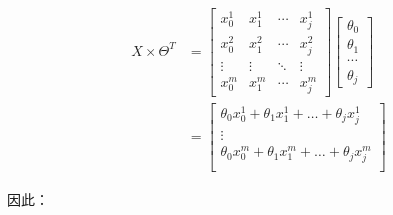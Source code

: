 \documentclass[12pt, a4paper]{article}
\begin{document}
\begin{enumerate}
          \begin{align*}
              X \times \Theta^T & = 
              \left[
                  \begin{matrix}
                      x_0^1  & x_1^1  & \cdots & x_j^1  \\
                      x_0^2  & x_1^2  & \cdots & x_j^2  \\
                      \vdots & \vdots & \ddots & \vdots \\
                      x_0^m  & x_1^m  & \cdots & x_j^m
                  \end{matrix}
                  \right]
              \left[
                  \begin{matrix}
                      \theta_0 \\
                      \theta_1 \\
                      \cdots   \\
                      \theta_j  
                  \end{matrix}
                  \right]            \\
                                & = 
              \left[
                  \begin{matrix}
                      \theta_0x_0^1+\theta_1x_1^1+\dots+\theta_jx_j^1 \\
                      \vdots                                          \\
                      \theta_0x_0^m+\theta_1x_1^m+\dots+\theta_jx_j^m \\
                  \end{matrix}
                  \right]
          \end{align*}
          
          因此：
          

\end{enumerate}
\end{document}
